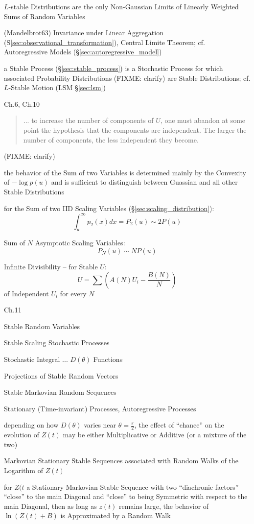$L$-stable Distributions are the only Non-Gaussian Limits of Linearly Weighted
Sums of Random Variables

(Mandelbrot63) Invariance under Linear Aggregation
(S\ref{sec:observational_transformation}), Central Limite Theorem; cf.
Autoregressive Models (\S\ref{sec:autoregressive_model})

a Stable Process (\S\ref{sec:stable_process}) is a Stochastic Process for which
associated Probability Distributions (FIXME: clarify) are Stable Distributions;
cf. $L$-Stable Motion (LSM \S\ref{sec:lsm})

Ch.6, Ch.10

\begin{quote}
  ... to increase the number of components of $U$, one must abandon at some
  point the hypothesis that the components are independent. The larger the
  number of components, the less independent they become.
\end{quote}
(FIXME: clarify)

the behavior of the Sum of two Variables is determined mainly by the Convexity
of $-\log p(u)$ and is sufficient to distinguish between Guassian and all other
Stable Distributions

for the Sum of two IID Scaling Variables (\S\ref{sec:scaling_distribution}):
\[
  \int_u^\infty p_2(x) dx = P_2(u) \sim 2 P(u)
\]

Sum of $N$ Asymptotic Scaling Variables:
\[
  P_N(u) \sim N P(u)
\]

Infinite Divisibility -- for Stable $U$:
\[
  U = \sum (A(N) U_i - \frac{B(N)}{N})
\]
of Independent $U_i$ for every $N$

Ch.11

Stable Random Variables

Stable Scaling Stochastic Processes

Stochastic Integral ... $D(\theta)$ Functions

Projections of Stable Random Vectors

Stable Markovian Random Sequences

Stationary (Time-invariant) Processes, Autoregressive Processes

depending on how $D(\theta)$ varies near $\theta = \frac{\pi}{2}$, the effect of
``chance'' on the evolution of $Z(t)$ may be either Multiplicative or Additive
(or a mixture of the two)

Markovian Stationary Stable Sequences associated with Random Walks of the
Logarithm of $Z(t)$

for $Z(t$ a Stationary Markovian Stable Sequence with two ``diachronic factors''
``close'' to the main Diagonal and ``close'' to being Symmetric with respect to
the main Diagonal, then as long as $z(t)$ remains large, the behavior of
$\ln(Z(t) + B)$ is Approximated by a Random Walk

